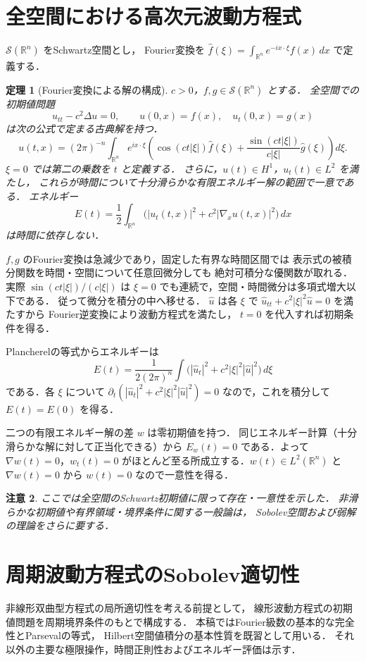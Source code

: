 \documentclass[a5paper,10pt,onecolumn]{jsarticle}
\makeatletter
\theoremstyle{mathnotetheorem}
\newtheorem{theorem}{定理}[section]
\newtheorem{remark}[theorem]{注意}
\renewcommand{\proofname}{証明}
\renewenvironment{proof}[1][\proofname]{%
  \par\pushQED{\qed}\normalfont\topsep4\p@\@plus2\p@\relax
  \trivlist\item[\hskip\labelsep\bfseries #1]\ignorespaces
}{\popQED\endtrivlist\@endpefalse}
\makeatother
\begin{document}
\section{全空間における高次元波動方程式}
$\mathcal S(\mathbb R^n)$ をSchwartz空間とし，
Fourier変換を
$\widehat f(\xi)=\int_{\mathbb R^n}e^{-ix\cdot\xi}f(x)\,dx$
で定義する．
\begin{theorem}[Fourier変換による解の構成]
$c>0$，$f,g\in\mathcal S(\mathbb R^n)$ とする．
全空間での初期値問題
\[
 u_{tt}-c^2\Delta u=0,\qquad u(0,x)=f(x),\quad u_t(0,x)=g(x)
\]
は次の公式で定まる古典解を持つ．
\[
 u(t,x)=(2\pi)^{-n}\int_{\mathbb R^n}
 e^{ix\cdot\xi}\left(
 \cos(ct|\xi|)\widehat f(\xi)
 +\frac{\sin(ct|\xi|)}{c|\xi|}\widehat g(\xi)
 \right)d\xi.
\]
$\xi=0$ では第二の乗数を $t$ と定義する．
さらに，$u(t)\in H^1$，$u_t(t)\in L^2$ を満たし，
これらが時間について十分滑らかな有限エネルギー解の範囲で一意である．
エネルギー
\[
 E(t)=\frac12\int_{\mathbb R^n}
 \bigl(|u_t(t,x)|^2+c^2|\nabla_xu(t,x)|^2\bigr)\,dx
\]
は時間に依存しない．
\end{theorem}
\begin{proof}
$f,g$ のFourier変換は急減少であり，固定した有界な時間区間では
表示式の被積分関数を時間・空間について任意回微分しても
絶対可積分な優関数が取れる．
実際 $\sin(ct|\xi|)/(c|\xi|)$ は
$\xi=0$ でも連続で，空間・時間微分は多項式増大以下である．
従って微分を積分の中へ移せる．
$\widehat u$ は各 $\xi$ で
$\widehat u_{tt}+c^2|\xi|^2\widehat u=0$ を満たすから
Fourier逆変換により波動方程式を満たし，
$t=0$ を代入すれば初期条件を得る．

Plancherelの等式からエネルギーは
\[
 E(t)=\frac{1}{2(2\pi)^n}\int
 \bigl(|\widehat u_t|^2+c^2|\xi|^2|\widehat u|^2\bigr)\,d\xi
\]
である．各 $\xi$ について
$\partial_t(|\widehat u_t|^2+c^2|\xi|^2|\widehat u|^2)=0$
なので，これを積分して $E(t)=E(0)$ を得る．

二つの有限エネルギー解の差 $w$ は零初期値を持つ．
同じエネルギー計算（十分滑らかな解に対して正当化できる）から
$E_w(t)=0$ である．よって $\nabla w(t)=0$，$w_t(t)=0$
がほとんど至る所成立する．$w(t)\in L^2(\mathbb R^n)$ と
$\nabla w(t)=0$ から $w(t)=0$ なので一意性を得る．
\end{proof}
\begin{remark}
ここでは全空間のSchwartz初期値に限って存在・一意性を示した．
非滑らかな初期値や有界領域・境界条件に関する一般論は，
Sobolev空間および弱解の理論をさらに要する．
\end{remark}


\section{周期波動方程式のSobolev適切性}
非線形双曲型方程式の局所適切性を考える前提として，
線形波動方程式の初期値問題を周期境界条件のもとで構成する．
本稿ではFourier級数の基本的な完全性とParsevalの等式，
Hilbert空間値積分の基本性質を既習として用いる．
それ以外の主要な極限操作，時間正則性およびエネルギー評価は示す．
\end{document}
